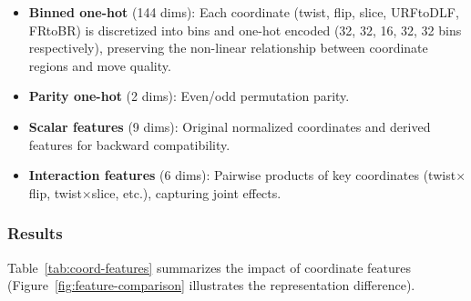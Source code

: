 \documentclass[conference]{IEEEtran}
\begin{document}
\begin{itemize}[leftmargin=*]
  \item \textbf{Binned one-hot} (144 dims): Each coordinate (twist, flip, slice, URFtoDLF, FRtoBR) is discretized into bins and one-hot encoded (32, 32, 16, 32, 32 bins respectively), preserving the non-linear relationship between coordinate regions and move quality.
  \item \textbf{Parity one-hot} (2 dims): Even/odd permutation parity.
  \item \textbf{Scalar features} (9 dims): Original normalized coordinates and derived features for backward compatibility.
  \item \textbf{Interaction features} (6 dims): Pairwise products of key coordinates (twist$\times$flip, twist$\times$slice, etc.), capturing joint effects.
\end{itemize}

\subsubsection{Results}
Table~\ref{tab:coord-features} summarizes the impact of coordinate features (Figure~\ref{fig:feature-comparison} illustrates the representation difference).

\begin{table}[htbp]
\centering
\caption{Effect of coordinate features on neural move ordering (200 scrambles, seed 42, $K{=}5$).}
\label{tab:coord-features}
\end{table}
\end{document}
